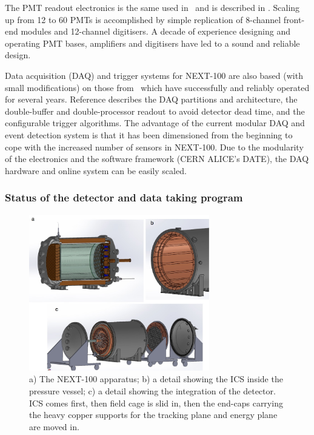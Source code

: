 \indent

The PMT readout electronics is the same  used in \NEW\ and is described in \cite{Alvarez:2019a}. Scaling up from 12 to 60 PMTs is accomplished by simple replication of 8-channel front-end modules and 12-channel digitisers. A decade of experience designing and operating PMT bases, amplifiers and digitisers have led to a sound and reliable design. %

\indent

Data acquisition (DAQ) and trigger systems for NEXT-100 are also based (with small modifications) on those from \NEW\, which have successfully and reliably operated for several years. Reference \cite{Esteve:2021a} describes the DAQ partitions and architecture, the double-buffer and double-processor readout to avoid detector dead time, and the configurable trigger algorithms. The advantage of the current modular DAQ and event detection system is that it has been dimensioned from the beginning to cope with the increased number of sensors in NEXT-100. Due to the modularity of the electronics and the software framework (CERN ALICE's DATE), the DAQ hardware and online system can be easily scaled.

\subsubsection{Status of the detector and data taking program}

\begin{figure}[!htb]
\centering
\includegraphics[width=0.7\textwidth]{img2/Next100Collage.jpg}
\caption{\small a) The NEXT-100 apparatus; b) a detail showing the ICS inside the pressure vessel; c) a detail showing the integration of the detector. ICS comes first, then field cage is slid in, then the end-caps carrying the heavy copper supports for the tracking plane and energy plane are moved in.} 
\label{fig.n100e}
\end{figure} 



